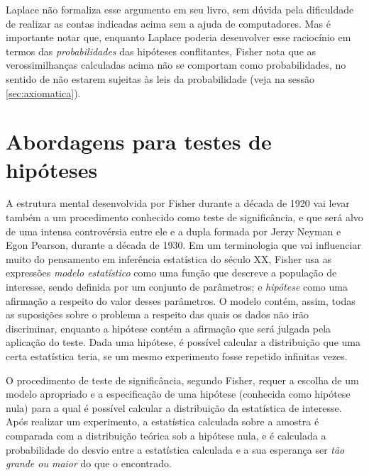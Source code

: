 Laplace não formaliza esse argumento em seu livro, sem dúvida pela dificuldade de realizar as contas indicadas acima sem
a ajuda de computadores. Mas é importante notar que, enquanto Laplace poderia desenvolver esse raciocínio em termos das 
{\em probabilidades} das hipóteses conflitantes, Fisher nota que as verossimilhanças calculadas acima não se comportam como 
probabilidades, no sentido de não estarem sujeitas às leis da
probabilidade (veja na sessão \ref{sec:axiomatica}).

\section{Abordagens para testes de hipóteses}

A estrutura mental desenvolvida por Fisher durante a década de 1920 vai levar também a um procedimento conhecido como teste de 
significância, e que será alvo de uma intensa controvérsia entre ele e a dupla formada por Jerzy Neyman e Egon Pearson, 
durante a década de 1930. Em um terminologia que vai influenciar muito do pensamento em inferência estatística do século XX,
Fisher usa as expressões {\em modelo estatístico} como uma função que descreve a população de interesse, sendo definida 
por um conjunto de parâmetros; e {\em hipótese} como uma afirmação a respeito do valor desses parâmetros. O modelo contém, 
assim, todas as suposições sobre o problema a respeito das quais os dados não irão discriminar, enquanto a hipótese
contém a afirmação que será julgada pela aplicação do teste. Dada uma hipótese, é possível
calcular a distribuição que uma certa estatística teria, se um mesmo experimento fosse repetido infinitas vezes.

O procedimento de teste de significância, segundo Fisher, requer a escolha de um modelo apropriado e a especificação de uma 
hipótese (conhecida como hipótese nula) para a qual é possível
calcular a distribuição da estatística de interesse.%
Após realizar um experimento, a estatística calculada sobre a amostra é comparada com a distribuição teórica sob a hipótese nula,
e é calculada a probabilidade do desvio entre a estatística calculada e a sua esperança ser {\em tão grande ou maior} do que o
encontrado. 

